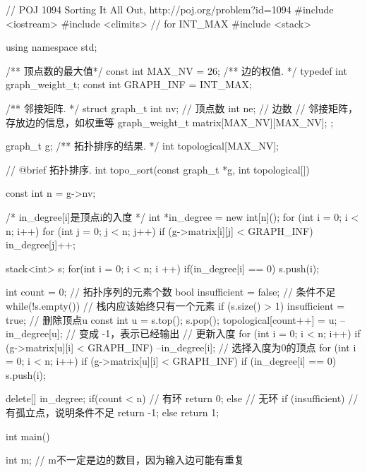 \begin{Codex}[label=poj_1094.cpp]
    // POJ 1094 Sorting It All Out, http://poj.org/problem?id=1094
    #include <iostream>
    #include <climits>  // for INT_MAX
    #include <stack>

    using namespace std;

    /** 顶点数的最大值*/
    const int MAX_NV  = 26;
    /** 边的权值. */
    typedef int graph_weight_t;
    const int GRAPH_INF = INT_MAX;

    /** 邻接矩阵. */
    struct graph_t {
        int nv; // 顶点数
        int ne; // 边数
        // 邻接矩阵，存放边的信息，如权重等
        graph_weight_t matrix[MAX_NV][MAX_NV];
    };

    graph_t g;
    /** 拓扑排序的结果. */
    int topological[MAX_NV];

    // @brief 拓扑排序.
    int topo_sort(const graph_t *g, int topological[]) {
        const int n = g->nv;

        /* in_degree[i]是顶点i的入度 */
        int *in_degree = new int[n]();
        for (int i = 0; i < n; i++) {
            for (int j = 0; j < n; j++) {
                if (g->matrix[i][j] < GRAPH_INF)
                    in_degree[j]++;
            }
        }

        stack<int> s;
        for(int i = 0; i < n; i ++) {
            if(in_degree[i] == 0) {
                s.push(i);
            }
        }

        int count = 0; // 拓扑序列的元素个数
        bool insufficient = false;  // 条件不足
        while(!s.empty()) {
            // 栈内应该始终只有一个元素
            if (s.size() > 1) insufficient = true;
            // 删除顶点u
            const int u = s.top(); s.pop();
            topological[count++] = u;
            --in_degree[u];  // 变成 -1，表示已经输出
            // 更新入度
            for (int i = 0; i < n; i++) if (g->matrix[u][i] < GRAPH_INF) {
                --in_degree[i];
            }
            // 选择入度为0的顶点
            for (int i = 0; i < n; i++) if (g->matrix[u][i] < GRAPH_INF) {
                if (in_degree[i] == 0) s.push(i);
            }
        }

        delete[] in_degree;
        if(count < n) { // 有环
            return 0;
        } else { // 无环
            if (insufficient) {  // 有孤立点，说明条件不足
                return -1;
            } else {
                return 1;
            }
        }
    }

    int main() {
        int m;  // m不一定是边的数目，因为输入边可能有重复

}
\end{Codex}
